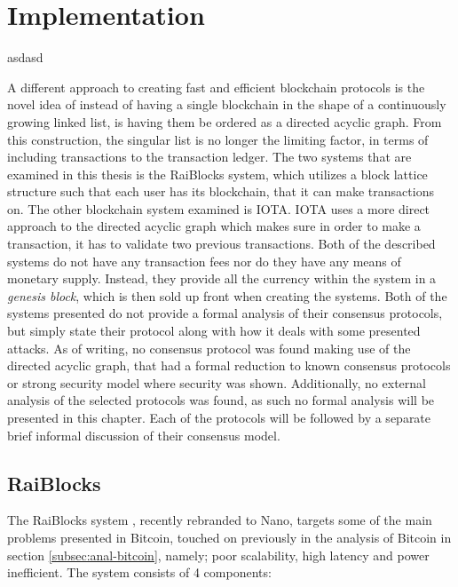 \chapter{Implementation}
\label{cha:impl}
asdasd

\iffalse
A different approach to creating fast and efficient blockchain protocols is the novel idea of instead of having a single blockchain in the shape of a continuously growing linked list, is having them be ordered as a directed acyclic graph. From this construction, the singular list is no longer the limiting factor, in terms of including transactions to the transaction ledger. The two systems that are examined in this thesis is the RaiBlocks system, which utilizes a block lattice structure such that each user has its blockchain, that it can make transactions on. The other blockchain system examined is IOTA. IOTA uses a more direct approach to the directed acyclic graph which makes sure in order to make a transaction, it has to validate two previous transactions. Both of the described systems do not have any transaction fees nor do they have any means of monetary supply. Instead, they provide all the currency within the system in a \emph{genesis block}, which is then sold up front when creating the systems. Both of the systems presented do not provide a formal analysis of their consensus protocols, but simply state their protocol along with how it deals with some presented attacks. As of writing, no consensus protocol was found making use of the directed acyclic graph, that had a formal reduction to known consensus protocols or strong security model where security was shown. Additionally, no external analysis of the selected protocols was found, as such no formal analysis will be presented in this chapter. Each of the protocols will be followed by a separate brief informal discussion of their consensus model.

\section{RaiBlocks}
The RaiBlocks system \cite{raiblocks}, recently rebranded to Nano, targets some of the main problems presented in Bitcoin, touched on previously in the analysis of Bitcoin in section \ref{subsec:anal-bitcoin}, namely; poor scalability, high latency and power inefficient. The system consists of 4 components:

